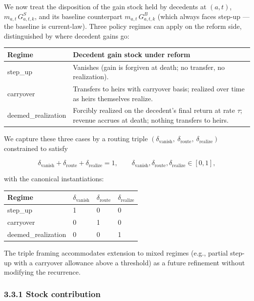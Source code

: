 \documentclass[11pt]{article}
\begin{document}
We now treat the disposition of the gain stock held by decedents at $(a, t)$, $m_{a,t}\,G^S_{a,t,k}$, and its baseline counterpart $m_{a,t}\,G^B_{a,t,k}$ (which always faces step-up — the baseline is current-law). Three policy regimes can apply on the reform side, distinguished by where decedent gains go:

\begin{center}
\begin{tabular}{|l|l|}
\hline
Regime & Decedent gain stock under reform \\
\hline
step\_up & Vanishes (gain is forgiven at death; no transfer, no realization). \\
\hline
carryover & Transfers to heirs with carryover basis; realized over time as heirs themselves realize. \\
\hline
deemed\_realization & Forcibly realized on the decedent's final return at rate $\tau$; revenue accrues at death; nothing transfers to heirs. \\
\hline
\end{tabular}
\end{center}

We capture these three cases by a routing triple $(\delta_{\text{vanish}},\ \delta_{\text{route}},\ \delta_{\text{realize}})$ constrained to satisfy

\[
\delta_{\text{vanish}} + \delta_{\text{route}} + \delta_{\text{realize}} = 1,
\qquad \delta_{\text{vanish}}, \delta_{\text{route}}, \delta_{\text{realize}} \in [0, 1],
\]

with the canonical instantiations:

\begin{center}
\begin{tabular}{|l|l|l|l|}
\hline
Regime & $\delta_{\text{vanish}}$ & $\delta_{\text{route}}$ & $\delta_{\text{realize}}$ \\
\hline
step\_up & 1 & 0 & 0 \\
\hline
carryover & 0 & 1 & 0 \\
\hline
deemed\_realization & 0 & 0 & 1 \\
\hline
\end{tabular}
\end{center}

The triple framing accommodates extension to mixed regimes (e.g., partial step-up with a carryover allowance above a threshold) as a future refinement without modifying the recurrence.

\subsubsection*{3.3.1 Stock contribution}
\end{document}
